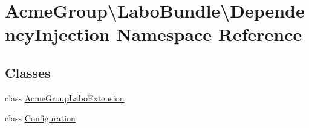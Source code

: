 \hypertarget{namespace_acme_group_1_1_labo_bundle_1_1_dependency_injection}{\section{Acme\+Group\textbackslash{}Labo\+Bundle\textbackslash{}Dependency\+Injection Namespace Reference}
\label{namespace_acme_group_1_1_labo_bundle_1_1_dependency_injection}
}
\subsection*{Classes}
\begin{DoxyCompactItemize}
\item 
class \hyperlink{class_acme_group_1_1_labo_bundle_1_1_dependency_injection_1_1_acme_group_labo_extension}{Acme\+Group\+Labo\+Extension}
\item 
class \hyperlink{class_acme_group_1_1_labo_bundle_1_1_dependency_injection_1_1_configuration}{Configuration}
\end{DoxyCompactItemize}
